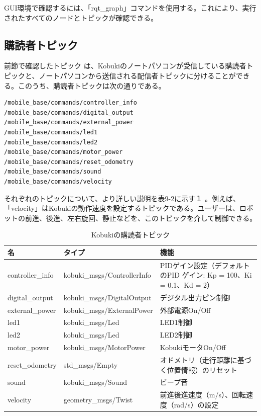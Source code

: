 \begin{itemize}
GUI環境で確認するには、「rqt\_graph」コマンドを使用する。これにより、実行されたすべてのノードとトピックが確認できる。

\subsection{購読者トピック}

前節で確認したトピック  は、Kobukiのノートパソコンが受信している購読者トピックと、ノートパソコンから送信される配信者トピックに分けることができる。このうち、購読者トピックは次の通りである。

\begin{lstlisting}[language=ROS]
/mobile_base/commands/controller_info
/mobile_base/commands/digital_output
/mobile_base/commands/external_power
/mobile_base/commands/led1
/mobile_base/commands/led2
/mobile_base/commands/motor_power
/mobile_base/commands/reset_odometry
/mobile_base/commands/sound
/mobile_base/commands/velocity
\end{lstlisting}

それぞれのトピックについて、より詳しい説明を表9-2に示す１ 。例えば、「velocity」はKobukiの動作速度を設定するトピックである。ユーザーは、ロボットの前進、後進、左右旋回、静止などを、このトピックを介して制御できる。

\begin{table}[h]
\centering
\begin{tabular}{l l l}
\toprule
\textbf{名} & \textbf{タイプ} & \textbf{機能}\\
\midrule
controller\_info & kobuki\_msgs/ControllerInfo  & PIDゲイン設定（デフォルトのPID ゲイン: Kp = 100、Ki = 0.1、Kd = 2）\\
digital\_output  & kobuki\_msgs/DigitalOutput & デジタル出力ピン制御 \\
external\_power  & kobuki\_msgs/ExternalPower & 外部電源On/Off \\
led1 & kobuki\_msgs/Led & LED1制御 \\
led2  & kobuki\_msgs/Led & LED2制御 \\
motor\_power & kobuki\_msgs/MotorPower  & KobukiモータOn/Off \\
reset\_odometry  & std\_msgs/Empty  & オドメトリ（走行距離に基づく位置情報）のリセット \\
sound & kobuki\_msgs/Sound & ビープ音 \\
velocity  & geometry\_msgs/Twist & 前進後進速度（m/s）、回転速度（rad/s）の設定 \\
\bottomrule
\end{tabular}
\caption{Kobukiの購読者トピック}
\end{table}


\end{itemize}
